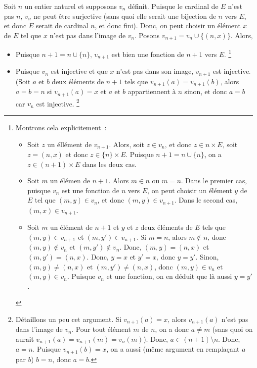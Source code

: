     Soit $n$ un entier naturel et supposons $v_n$ définit. 
    Puisque le cardinal de $E$ n'est pas $n$, $v_n$ ne peut être surjective (sans quoi elle serait une bijection de $n$ vers $E$, et donc $E$ serait de cardinal $n$, et donc fini). 
    Donc, on peut choisir un élément $x$ de $E$ tel que $x$ n'est pas dans l'image de $v_n$. 
    Posons $v_{n+1} = v_n \cup \lbrace (n, x) \rbrace$. 
    Alors, 
    \begin{itemize}[nosep]
        \item Puisque $n+1 = n \cup \lbrace n \rbrace$, $v_{n+1}$ est bien une fonction de $n+1$ vers $E$.%
            \footnote{
                Montrons cela explicitement : 
                \begin{itemize}[nosep]
                    \item Soit $z$ un éllément de $v_{n+1}$.
                        Alors, soit $z \in v_n$, et donc $z \in n \times E$, soit $z = (n,x)$ et donc $z \in \lbrace n \rbrace \times E$.
                        Puisque $n + 1 = n \cup \lbrace n \rbrace$, on a $z \in (n+1) \times E$ dans les deux cas.
                    \item Soit $m$ un élémen de $n+1$.
                        Alors $m \in n$ ou $m = n$.
                        Dans le premier cas, puisque $v_n$ est une fonction de $n$ vers $E$, on peut choisir un élément $y$ de $E$ tel que $(m,y) \in v_n$, et donc $(m,y) \in v_{n+1}$.
                        Dans le second cas, $(m,x) \in v_{n+1}$.
                    \item Soit $m$ un élément de $n+1$ et $y$ et $z$ deux éléments de $E$ tels que $(m,y) \in v_{n+1}$ et $(m,y') \in v_{n+1}$.
                        Si $m = n$, alors $m \notin n$, donc $(m,y) \notin v_n$ et $(m,y') \notin v_n$.
                        Donc, $(m,y) = (n,x)$ et $(m,y') = (n,x)$.
                        Donc, $y = x$ et $y' = x$, donc $y = y'$.
                        Sinon, $(m,y) \neq (n,x)$ et $(m,y') \neq (n,x)$, donc $(m,y) \in v_n$ et $(m,y) \in v_n$.
                        Puisque $v_n$ et une fonction, on en déduit que là aussi $y = y'$.
                \end{itemize}
            }
        \item Puisque $v_n$ est injective et que $x$ n'est pas dans son image, $v_{n+1}$ est injective. (Soit $a$ et $b$ deux éléments de $n+1$ tels que $v_{n+1}(a) = v_{n+1}(b)$, alors $a = b = n$ si $v_{n+1}(a) = x$ et $a$ et $b$ appartiennent à $n$ sinon, et donc $a = b$ car $v_n$ est injective.%
            \footnote{Détaillons un peu cet argument.
            Si $v_{n+1}(a) = x$, alors $v_{n+1}(a)$ n'est pas dans l'image de $v_n$. 
            Pour tout élément $m$ de $n$, on a donc $a \neq m$ (sans quoi on aurait $v_{n+1}(a) = v_{n+1}(m) = v_n(m)$).
            Donc, $a \in (n+1) \setminus n$. 
            Donc, $a = n$.
            Puisque $v_{n+1}(b) = x$, on a aussi (même argument en remplaçant $a$ par $b$) $b = n$, donc $a = b$. 

}
\end{itemize}
